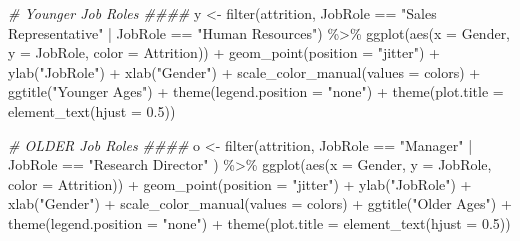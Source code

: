 \documentclass[
]{article}
\newenvironment{Shaded}{\begin{snugshade}}{\end{snugshade}}
\newcommand{\AttributeTok}[1]{\textcolor[rgb]{0.77,0.63,0.00}{#1}}
\newcommand{\CommentTok}[1]{\textcolor[rgb]{0.56,0.35,0.01}{\textit{#1}}}
\newcommand{\FloatTok}[1]{\textcolor[rgb]{0.00,0.00,0.81}{#1}}
\newcommand{\FunctionTok}[1]{\textcolor[rgb]{0.00,0.00,0.00}{#1}}
\newcommand{\NormalTok}[1]{#1}
\newcommand{\OtherTok}[1]{\textcolor[rgb]{0.56,0.35,0.01}{#1}}
\newcommand{\SpecialCharTok}[1]{\textcolor[rgb]{0.00,0.00,0.00}{#1}}
\newcommand{\StringTok}[1]{\textcolor[rgb]{0.31,0.60,0.02}{#1}}
\begin{document}
\begin{Shaded}
\begin{Highlighting}[]
\CommentTok{\# Younger Job Roles \#\#\#\#}
\NormalTok{y }\OtherTok{\textless{}{-}} \FunctionTok{filter}\NormalTok{(attrition, JobRole }\SpecialCharTok{==} \StringTok{"Sales Representative"} \SpecialCharTok{|}\NormalTok{ JobRole }\SpecialCharTok{==} \StringTok{"Human Resources"}\NormalTok{) }\SpecialCharTok{\%\textgreater{}\%}
  \FunctionTok{ggplot}\NormalTok{(}\FunctionTok{aes}\NormalTok{(}\AttributeTok{x =}\NormalTok{ Gender, }\AttributeTok{y =}\NormalTok{ JobRole, }\AttributeTok{color =}\NormalTok{ Attrition)) }\SpecialCharTok{+}
  \FunctionTok{geom\_point}\NormalTok{(}\AttributeTok{position =} \StringTok{"jitter"}\NormalTok{) }\SpecialCharTok{+}
  \FunctionTok{ylab}\NormalTok{(}\StringTok{"JobRole"}\NormalTok{) }\SpecialCharTok{+}
  \FunctionTok{xlab}\NormalTok{(}\StringTok{"Gender"}\NormalTok{) }\SpecialCharTok{+}
  \FunctionTok{scale\_color\_manual}\NormalTok{(}\AttributeTok{values =}\NormalTok{ colors) }\SpecialCharTok{+}
  \FunctionTok{ggtitle}\NormalTok{(}\StringTok{"Younger Ages"}\NormalTok{) }\SpecialCharTok{+}
  \FunctionTok{theme}\NormalTok{(}\AttributeTok{legend.position =} \StringTok{"none"}\NormalTok{) }\SpecialCharTok{+}
  \FunctionTok{theme}\NormalTok{(}\AttributeTok{plot.title =} \FunctionTok{element\_text}\NormalTok{(}\AttributeTok{hjust =} \FloatTok{0.5}\NormalTok{)) }
  

\CommentTok{\# OLDER Job Roles \#\#\#\#}
\NormalTok{o }\OtherTok{\textless{}{-}} \FunctionTok{filter}\NormalTok{(attrition, JobRole }\SpecialCharTok{==} \StringTok{"Manager"} \SpecialCharTok{|}\NormalTok{ JobRole }\SpecialCharTok{==} \StringTok{"Research Director"}\NormalTok{ ) }\SpecialCharTok{\%\textgreater{}\%}
  \FunctionTok{ggplot}\NormalTok{(}\FunctionTok{aes}\NormalTok{(}\AttributeTok{x =}\NormalTok{ Gender, }\AttributeTok{y =}\NormalTok{ JobRole, }\AttributeTok{color =}\NormalTok{ Attrition)) }\SpecialCharTok{+}
  \FunctionTok{geom\_point}\NormalTok{(}\AttributeTok{position =} \StringTok{"jitter"}\NormalTok{) }\SpecialCharTok{+}
  \FunctionTok{ylab}\NormalTok{(}\StringTok{"JobRole"}\NormalTok{) }\SpecialCharTok{+}
  \FunctionTok{xlab}\NormalTok{(}\StringTok{"Gender"}\NormalTok{) }\SpecialCharTok{+}
  \FunctionTok{scale\_color\_manual}\NormalTok{(}\AttributeTok{values =}\NormalTok{ colors) }\SpecialCharTok{+}
  \FunctionTok{ggtitle}\NormalTok{(}\StringTok{"Older Ages"}\NormalTok{) }\SpecialCharTok{+}
  \FunctionTok{theme}\NormalTok{(}\AttributeTok{legend.position =} \StringTok{"none"}\NormalTok{) }\SpecialCharTok{+}
  \FunctionTok{theme}\NormalTok{(}\AttributeTok{plot.title =} \FunctionTok{element\_text}\NormalTok{(}\AttributeTok{hjust =} \FloatTok{0.5}\NormalTok{)) }



\end{Highlighting}
\end{Shaded}
\end{document}
